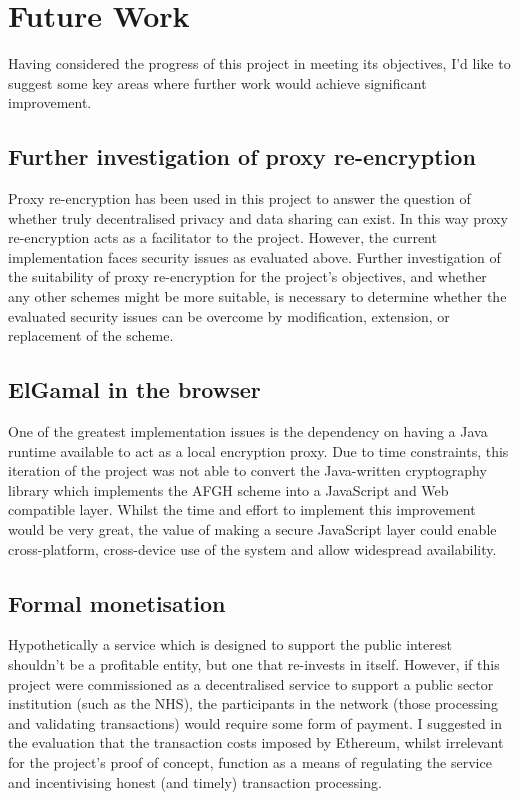 \section{Future Work}

Having considered the progress of this project in meeting its objectives, I'd like to suggest some key areas where further work would achieve significant improvement.

\subsection{Further investigation of proxy re-encryption}

Proxy re-encryption has been used in this project to answer the question of whether truly decentralised privacy and data sharing can exist. In this way proxy re-encryption acts as a facilitator to the project. However, the current implementation faces security issues as evaluated above. Further investigation of the suitability of proxy re-encryption for the project's objectives, and whether any other schemes might be more suitable, is necessary to determine whether the evaluated security issues can be overcome by modification, extension, or replacement of the scheme.

\subsection{ElGamal in the browser}

One of the greatest implementation issues is the dependency on having a Java runtime available to act as a local encryption proxy. Due to time constraints, this iteration of the project was not able to convert the Java-written cryptography library which implements the AFGH scheme into a JavaScript and Web compatible layer. Whilst the time and effort to implement this improvement would be very great, the value of making a secure JavaScript layer could enable cross-platform, cross-device use of the system and allow widespread availability.

\subsection{Formal monetisation}

Hypothetically a service which is designed to support the public interest shouldn't be a profitable entity, but one that re-invests in itself. However, if this project were commissioned as a decentralised service to support a public sector institution (such as the NHS), the participants in the network (those processing and validating transactions) would require some form of payment. I suggested in the evaluation that the transaction costs imposed by Ethereum, whilst irrelevant for the project's proof of concept, function as a means of regulating the service and incentivising honest (and timely) transaction processing.

